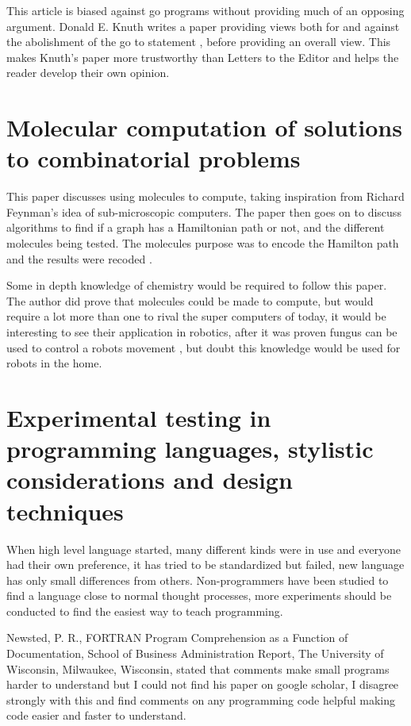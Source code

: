 \documentclass{scrartcl}
\begin{document}
This article is biased against go programs without providing much of an opposing argument. Donald E. Knuth writes a paper providing views both for and against the abolishment of the go to statement \cite{knuth1974structured}, before providing an overall view. This makes Knuth’s paper more trustworthy than Letters to the Editor and helps the reader develop their own opinion.

\section{Molecular computation of solutions to combinatorial problems}

This paper discusses using molecules to compute, taking inspiration from Richard Feynman’s idea of sub-microscopic computers.  The paper then goes on to discuss algorithms to find if a graph has a Hamiltonian path or not, and the different molecules being tested. The molecules purpose was to encode the Hamilton path and the results were recoded \cite{adleman1994molecular}.

Some in depth knowledge of chemistry would be required to follow this paper. The author did prove that molecules could be made to compute, but would require a lot more than one to rival the super computers of today, it would be interesting to see their application in robotics, after it was proven fungus can be used to control a robots movement \cite{schwarz2013development}, but doubt this knowledge would be used for robots in the home.

\section{Experimental testing in programming languages, stylistic considerations and design techniques}

When high level language started, many different kinds were in use and everyone had their own preference, it has tried to be standardized but failed, new language has only small differences from others. Non-programmers have been studied to find a language close to normal thought processes, more experiments should be conducted to find the easiest way to teach programming.\cite{shneiderman1975experimental}

Newsted, P. R., FORTRAN Program Comprehension as a Function of Documentation, School of Business Administration Report, The University of Wisconsin, Milwaukee, Wisconsin, stated that comments make small programs harder to understand but I could not find his paper on google scholar, I disagree strongly with this and find comments on any programming code helpful making code easier and faster to understand.



\end{document}
